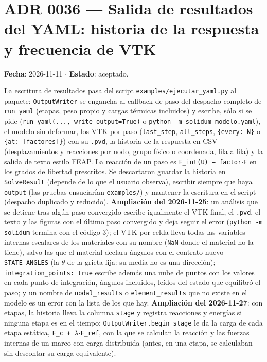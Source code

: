 \documentclass[11pt,oneside]{report}
\begin{document}
\section{ADR 0036 --- Salida de resultados del YAML: historia de la respuesta y frecuencia de VTK}
\label{adr:0036}

\textbf{Fecha}: 2026-11-11 \ensuremath{\cdot} \textbf{Estado}: aceptado.

La escritura de resultados pasa del script \texttt{examples/\allowbreak{}ejecutar\_\allowbreak{}yaml.\allowbreak{}py} al paquete: \texttt{OutputWriter} se engancha al callback de paso del despacho completo de \texttt{run\_yaml} (etapas, peso propio y cargas térmicas incluidos) y escribe, sólo si se pide (\texttt{run\_\allowbreak{}yaml(.\allowbreak{}.\allowbreak{}.\allowbreak{}, write\_\allowbreak{}output=True)} o \texttt{python -m solidum modelo.\allowbreak{}yaml}), el modelo sin deformar, los VTK por paso (\texttt{last\_step}, \texttt{all\_steps}, \texttt{\{every: N\}} o \texttt{\{at: [factores]\}}) con su \texttt{.pvd}, la historia de la respuesta en CSV (desplazamientos y reacciones por nodo, grupo físico o coordenada, fila a fila) y la salida de texto estilo FEAP. La reacción de un paso es \texttt{F\_\allowbreak{}int(U) − factor\ensuremath{\cdot}F} en los grados de libertad prescritos. Se descartaron guardar la historia en \texttt{SolveResult} (depende de lo que el usuario observa), escribir siempre que haya \texttt{output} (las pruebas ensuciarían \texttt{examples/}) y mantener la escritura en el script (despacho duplicado y reducido). \textbf{Ampliación del 2026-11-25}: un análisis que se detiene tras algún paso convergido escribe igualmente el VTK final, el \texttt{.pvd}, el texto y las figuras con el último paso convergido y deja seguir el error (\texttt{python -m solidum} termina con el código 3); el VTK por celda lleva todas las variables internas escalares de los materiales con su nombre (\texttt{NaN} donde el material no la tiene), salvo las que el material declara ángulos con el contrato nuevo \texttt{STATE\_ANGLES} (la \ensuremath{\theta} de la grieta fija: su media no es una dirección); \texttt{integration\_\allowbreak{}points: true} escribe además una nube de puntos con los valores en cada punto de integración, ángulos incluidos, leídos del estado que equilibró el paso; y un nombre de \texttt{nodal\_results} o \texttt{element\_results} que no existe en el modelo es un error con la lista de los que hay. \textbf{Ampliación del 2026-11-27}: con etapas, la historia lleva la columna \texttt{stage} y registra reacciones y energías si ninguna etapa es en el tiempo; \texttt{OutputWriter.\allowbreak{}begin\_\allowbreak{}stage} le da la carga de cada etapa estática, \texttt{F\_c + \ensuremath{\lambda}\ensuremath{\cdot}F\_ref}, con la que se calculan la reacción y las fuerzas internas de un marco con carga distribuida (antes, en una etapa, se calculaban sin descontar su carga equivalente).
\end{document}
